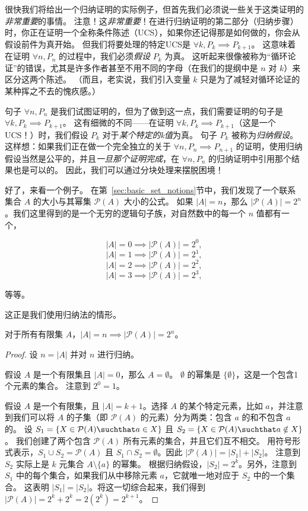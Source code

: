 很快我们将给出一个归纳证明的实际例子，但首先我们必须说一些关于这类证明的\emph{非常重要}的事情。
注意！这\emph{非常重要}！在进行归纳证明的第二部分（归纳步骤）时，你正在证明一个全称条件陈述（UCS），如果你还记得那是如何做的，你会从假设前件为真开始。
但我们将要处理的特定UCS是 $\forall k,  P_k \implies P_{k+1}$。
这意味着在证明 $\forall n,  P_n$ 的过程中，我们必须\emph{假设} $P_k$ 为真。
这听起来很像被称为“循环论证”的错误，尤其是许多作者甚至不用不同的字母（在我们的提纲中是 $n$ 对 $k$）来区分这两个陈述。
（而且，老实说，我们引入变量 $k$ 只是为了减轻对循环论证的某种挥之不去的愧疚感。）

句子 $\forall n,  P_n$ 是我们试图证明的，但为了做到这一点，我们需要证明的句子是 $\forall k,  P_k \implies P_{k+1}$。
这有细微的不同——在证明 $\forall k,  P_k \implies P_{k+1}$（这是一个UCS！）时，我们假设 $P_k$ 对于{\em 某个特定的k值}为真。
句子 $P_k$ 被称为\emph{归纳假设}。
这样想：如果我们正在做一个完全独立的关于 $\forall n,  P_n \implies P_{n+1}$ 的证明，使用归纳假设当然是公平的，并且\emph{一旦那个证明完成}，在 $\forall n,  P_n$ 的归纳证明中引用那个结果也是可以的。
因此，我们可以通过分块处理来摆脱困境！

好了，来看一个例子。
在第~\ref{sec:basic_set_notions}节中，我们发现了一个联系集合 $A$ 的大小与其幂集 ${\mathcal P}(A)$ 大小的公式。
如果 $|A| = n$，那么 $|{\mathcal P}(A)| = 2^n$。我们这里得到的是一个无穷的逻辑句子族，对自然数中的每一个 $n$ 值都有一个，

\[ |A| = 0 \implies |{\mathcal P}(A)| = 2^0, \]
\[ |A| = 1 \implies |{\mathcal P}(A)| = 2^1, \]
\[ |A| = 2 \implies |{\mathcal P}(A)| = 2^2, \]
\[ |A| = 3 \implies |{\mathcal P}(A)| = 2^3, \]

\noindent 等等。

这正是我们使用归纳法的情形。

\begin{thm} 
对于所有有限集 $A$，$\displaystyle |A| = n \implies  |{\mathcal P}(A)| = 2^n$。
\end{thm}

\begin{proof}
设 $n = |A|$ 并对 $n$ 进行归纳。

 假设 $A$ 是一个有限集且 $|A| = 0$，那么 $A = \emptyset$。
$\emptyset$ 的幂集是 $\{ \emptyset \}$，这是一个包含1个元素的集合。
注意到 $2^0 = 1$。
  
 假设 $A$ 是一个有限集，且 $|A| = k+1$。选择 $A$ 的某个特定元素，比如 $a$，并注意到我们可以将 $A$ 的子集（即 ${\mathcal P}(A)$ 的元素）分为两类：包含 $a$ 的和不包含 $a$ 的。
设 $S_1 = \{ X \in {\mathcal P}(A) \suchthat a \in X \}$ 且 $S_2 = \{ X \in {\mathcal P}(A) \suchthat a \notin X \}$。
我们创建了两个包含 ${\mathcal P}(A)$ 所有元素的集合，并且它们互不相交。
用符号形式表示，$S_1 \cup S_2 = {\mathcal P}(A)$ 且 $S_1 \cap S_2 = \emptyset$。因此 $|{\mathcal P}(A)| = |S_1| + |S_2|$。
注意到 $S_2$ 实际上是 $k$ 元集合 $A \setminus \{ a \}$ 的幂集。
根据归纳假设，$|S_2| = 2^k$。另外，注意到 $S_1$ 中的每个集合，如果我们从中移除元素 $a$，它就唯一地对应于 $S_2$ 中的一个集合。
这表明 $|S_1| = |S_2|$。将这一切综合起来，我们得到 $|{\mathcal P}(A)| = 2^k + 2^k = 2(2^k) = 2^{k+1}$。
\end{proof}

